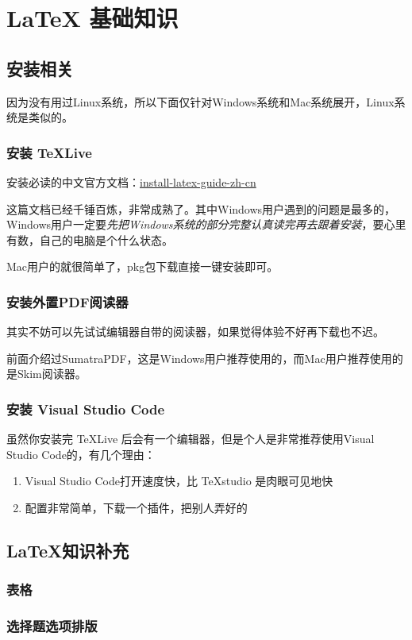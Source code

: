 \section{ \LaTeX{} 基础知识}

\subsection{安装相关}
因为没有用过Linux系统，所以下面仅针对Windows系统和Mac系统展开，Linux系统是类似的。


\subsubsection{ 安装 \TeX Live }
安装必读的中文官方文档：\href{https://gitee.com/OsbertWang/install-latex-guide-zh-cn/releases}{install-latex-guide-zh-cn}

这篇文档已经千锤百炼，非常成熟了。其中Windows用户遇到的问题是最多的，Windows用户一定要\emph{先把Windows系统的部分完整认真读完再去跟着安装}，要心里有数，自己的电脑是个什么状态。

Mac用户的就很简单了，pkg包下载直接一键安装即可。


\subsubsection{ 安装外置PDF阅读器 }

其实不妨可以先试试编辑器自带的阅读器，如果觉得体验不好再下载也不迟。

前面介绍过SumatraPDF，这是Windows用户推荐使用的，而Mac用户推荐使用的是Skim阅读器。

\subsubsection{ 安装 Visual Studio Code }

虽然你安装完 \TeX Live 后会有一个编辑器，但是个人是非常推荐使用Visual Studio Code的，有几个理由：

\begin{enumerate}
  \item Visual Studio Code打开速度快，比 \TeX studio 是肉眼可见地快
  \item 配置非常简单，下载一个插件，把别人弄好的
\end{enumerate}



\subsection{\LaTeX{}知识补充}

\subsubsection{表格}

\subsubsection{选择题选项排版}
